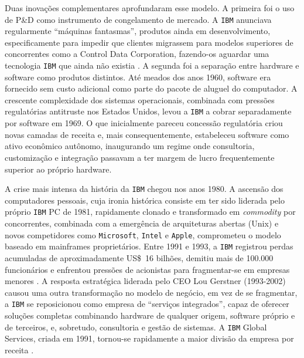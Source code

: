 Duas inovações complementares aprofundaram esse modelo. A primeira foi o uso de P\&D como instrumento de congelamento de mercado. A \texttt{IBM} anunciava regularmente \enquote{máquinas fantasmas}, produtos ainda em desenvolvimento, especificamente para impedir que clientes migrassem para modelos superiores de concorrentes como a Control Data Corporation, fazendo-os aguardar uma tecnologia \texttt{IBM} que ainda não existia \parencite{Cortada2019IBM}. A segunda foi a separação entre hardware e software como produtos distintos. Até meados dos anos 1960, software era fornecido sem custo adicional como parte do pacote de aluguel do computador. A crescente complexidade dos sistemas operacionais, combinada com pressões regulatórias antitruste nos Estados Unidos, levou a \texttt{IBM} a cobrar separadamente por software em 1969. O que inicialmente pareceu concessão regulatória criou novas camadas de receita e, mais consequentemente, estabeleceu software como ativo econômico autônomo, inaugurando um regime onde consultoria, customização e integração passavam a ter margem de lucro frequentemente superior ao próprio hardware.

A crise mais intensa da história da \texttt{IBM} chegou nos anos 1980. A ascensão dos computadores pessoais, cuja ironia histórica consiste em ter sido liderada pelo próprio \texttt{IBM} PC de 1981, rapidamente clonado e transformado em \textit{commodity} por concorrentes, combinada com a emergência de arquiteturas abertas (Unix) e novos competidores como \texttt{Microsoft}, \texttt{Intel} e \texttt{Apple}, comprometeu o modelo baseado em mainframes proprietários. Entre 1991 e 1993, a \texttt{IBM} registrou perdas acumuladas de aproximadamente US\$~16 bilhões, demitiu mais de 100.000 funcionários e enfrentou pressões de acionistas para fragmentar-se em empresas menores \parencite[p.~47]{Gerstner2002Who}. A resposta estratégica liderada pelo CEO Lou Gerstner (1993-2002) causou uma outra transformação no modelo de negócio, em vez de se fragmentar, a \texttt{IBM} se reposicionou como empresa de \enquote{serviços integrados}, capaz de oferecer soluções completas combinando hardware de qualquer origem, software próprio e de terceiros, e, sobretudo, consultoria e gestão de sistemas. A \texttt{IBM} Global Services, criada em 1991, tornou-se rapidamente a maior divisão da empresa por receita \parencite{Cortada2019IBM}. 

